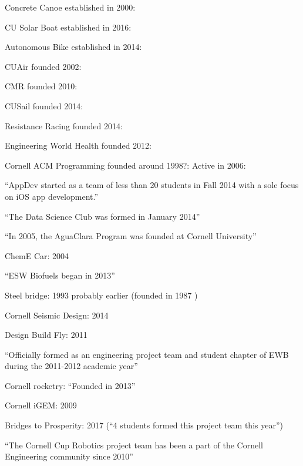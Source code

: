 \documentclass[12pt]{article}
\begin{document}
Concrete Canoe established in 2000:
\cite{noauthor_cornell_2017}

CU Solar Boat established in 2016:
\cite{noauthor_cu_2017}

Autonomous Bike established in 2014:
\cite{murphy_cu_2017}

CUAir founded 2002:
\cite{noauthor_cuair_2017}

CMR founded 2010:
\cite{noauthor_cornell_2018}

CUSail founded 2014:
\cite{noauthor_cu_2017-1}

Resistance Racing founded 2014:
\cite{noauthor_about_2015}

Engineering World Health founded 2012:
\cite{noauthor_cornell_2017-1}

Cornell ACM Programming founded around 1998?:
\cite{noauthor_cornell_2016}
Active in 2006:
\cite{noauthor_cornell_2018-1}

``AppDev started as a team of less than 20 students in Fall 2014 with a sole focus on iOS app development.''
\cite{cornell_appdev_introducing_2018}

``The Data Science Club was formed in January 2014''
\cite{noauthor_cornell_2014}

``In 2005, the AguaClara Program was founded at Cornell University''
\cite{noauthor_aguaclara_2017}

ChemE Car: 2004
\cite{noauthor_cornell_2017-2}

``ESW Biofuels began in 2013''
\cite{noauthor_esw_2017}

Steel bridge: 1993
\cite{noauthor_cee_2011}
probably earlier (founded in 1987 \cite{robert_e._shaw_jr._bridging_1988})

Cornell Seismic Design: 2014
\cite{noauthor_2014_2014}

Design Build Fly: 2011
\cite{noauthor_design/build/fly_2017}

``Officially formed as an engineering project team and student chapter of EWB during the 2011-2012 academic year''
\cite{noauthor_our_2016}

Cornell rocketry: ``Founded in 2013''
\cite{noauthor_cornell_2015}

Cornell iGEM: 2009
\cite{noauthor_team:cornell/team_2009}

Bridges to Prosperity: 2017 (``4 students formed this project team this year'')
\cite{noauthor_give_2018}

``The Cornell Cup Robotics project team has been a part of the Cornell Engineering community since 2010''
\cite{noauthor_cornell_2018-2}
\end{document}

